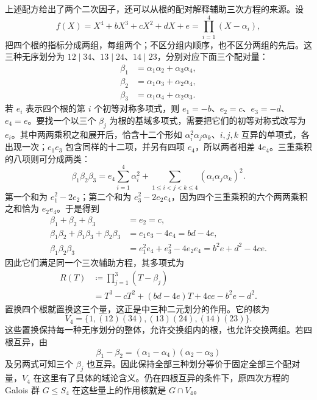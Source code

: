 \ProseParagraphBreak
上述配方给出了两个二次因子，还可以从根的配对解释辅助三次方程的来源。设
\[
	f(X)=X^4+bX^3+cX^2+dX+e =\prod_{i=1}^4(X-\alpha_i),
\]
把四个根的指标分成两组，每组两个；不区分组内顺序，也不区分两组的先后。这三种无序划分为 \(12\mid34\)、\(13\mid24\)、\(14\mid23\)，分别对应下面三个配对量：
\[
	\begin{aligned}
		\beta_1&=\alpha_1\alpha_2+\alpha_3\alpha_4,\\
		\beta_2&=\alpha_1\alpha_3+\alpha_2\alpha_4,\\
		\beta_3&=\alpha_1\alpha_4+\alpha_2\alpha_3.
	\end{aligned}
\]
若 \(e_i\) 表示四个根的第 \(i\) 个初等对称多项式，则 \(e_1=-b\)、\(e_2=c\)、\(e_3=-d\)、\(e_4=e\)。要找一个以三个 \(\beta_j\) 为根的基域多项式，需要把它们的初等对称式改写为 \(e_i\)。其中两两乘积之和展开后，恰含十二个形如 \(\alpha_i^2\alpha_j\alpha_k\)、\(i,j,k\) 互异的单项式，各出现一次；\(e_1e_3\) 包含同样的十二项，并另有四项 \(e_4\)，所以两者相差 \(4e_4\)。三重乘积的八项则可分成两类：
\[
	\beta_1\beta_2\beta_3 =e_4\sum_{i=1}^4\alpha_i^2 +\sum_{1\le i<j<k\le4}(\alpha_i\alpha_j\alpha_k)^2.
\]
第一个和为 \(e_1^2-2e_2\)；第二个和为 \(e_3^2-2e_2e_4\)，因为四个三重乘积的六个两两乘积之和恰为 \(e_2e_4\)。于是得到
\begin{align*}
	\beta_1+\beta_2+\beta_3&=e_2=c,\\
	\beta_1\beta_2+\beta_1\beta_3+\beta_2\beta_3 &=e_1e_3-4e_4=bd-4e,\\
	\beta_1\beta_2\beta_3&=e_1^2e_4+e_3^2-4e_2e_4 =b^2e+d^2-4ce.
\end{align*}
因此它们满足同一个三次辅助方程，其多项式为
\begin{equation}\label{b1:eq:quartic-cubic-resolvent}
	\begin{aligned}
		R(T)&\coloneqq\prod_{j=1}^3(T-\beta_j)\\
		&=T^3-cT^2+(bd-4e)T+4ce-b^2e-d^2.
	\end{aligned}
\end{equation}
置换四个根就置换这三个量，这正是中三种二元划分的作用。它的核为
\[
	V_4=\{1,(12)(34),(13)(24),(14)(23)\}.
\]
这些置换保持每一种无序划分的整体，允许交换组内的根，也允许交换两组。若四根互异，由
\[
	\beta_1-\beta_2=(\alpha_1-\alpha_4)(\alpha_2-\alpha_3)
\]
及另两式可知三个 \(\beta_j\) 也互异。因此保持全部三种划分等价于固定全部三个配对量，\(V_4\) 在这里有了具体的域论含义。仍在四根互异的条件下，原四次方程的 Galois 群 \(G\leq S_4\) 在这些量上的作用核就是 \(G\cap V_4\)。

